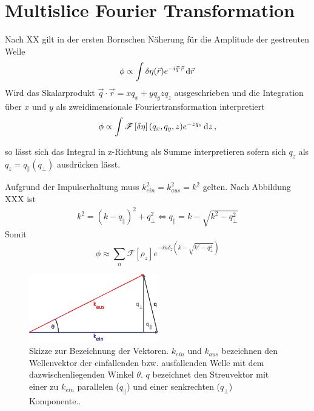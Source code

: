 \section{Multislice Fourier Transformation}
	Nach XX gilt in der ersten Bornschen Näherung für die Amplitude der gestreuten Welle
	\begin{equation}
		\phi\propto\int \delta\eta(\vec{r}) e^{-i\vec{q}\cdot \vec{r}} \dif \vec{r}
	\end{equation}
    Wird das Skalarprodukt $\vec{q}\cdot \vec{r}=xq_x+yq_yzq_z$ ausgeschrieben und die Integration über $x$ und $y$ als zweidimensionale Fouriertransformation interpretiert
	\begin{equation}
	\phi\propto\int \mathscr{F}\left[\delta\eta\right](q_x,q_y,z) e^{-zq_z} \dif z \, ,
	\end{equation}

	so lässt sich das Integral in z-Richtung als Summe interpretieren sofern sich $q_z$ als $q_z=q_\parallel(q_\perp)$ ausdrücken lässt.
	
	Aufgrund der Impulserhaltung muss $k_{ein}^2=k_{aus}^2=k^2$ gelten. Nach Abbildung XXX ist
	\begin{align}
	k^2=(k-q_\parallel)^2+q_{\perp}^2
	\Leftrightarrow q_\parallel=k-\sqrt{k^2-q_\perp^2}
	\end{align}
	Somit
	\begin{equation}
	\phi\approx\sum_n{\mathscr{F}\left[\rho_z\right] e^{-in\delta_z\left(k-\sqrt{k^2-q_\perp^2}\right) }}
	\end{equation}

	\begin{figure}
		\centering
		\includegraphics[width=0.5\textwidth]{images/msft.eps}
		\caption[Vektoren bei MSFT]{Skizze zur Bezeichnung der Vektoren. $k_{ein}$ und $k_{aus}$ bezeichnen den Wellenvektor der einfallenden bzw. ausfallenden Welle mit dem dazwischenliegenden Winkel $\theta$. $q$ bezeichnet den Streuvektor mit einer zu $k_{ein}$ parallelen ($q_{||}$) und einer senkrechten ($q_\perp$) Komponente.. }
		\label{fig:msft}
	\end{figure} 

